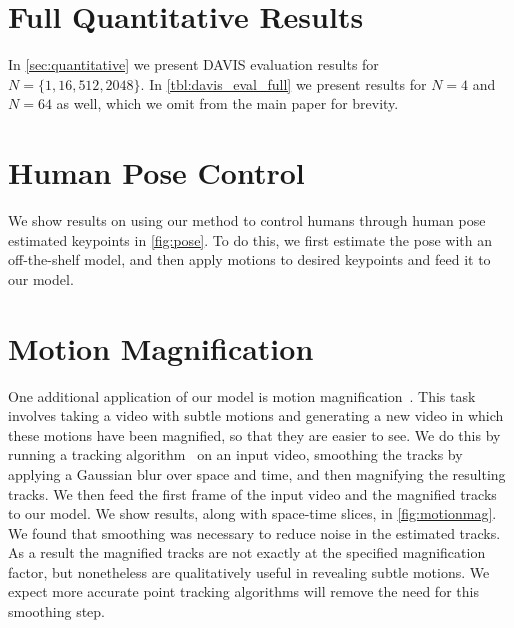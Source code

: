 \section{Full Quantitative Results}
\label{apdx:quantitative}

In \cref{sec:quantitative} we present DAVIS evaluation results for $N = \{1, 16, 512, 2048\}$. In \cref{tbl:davis_eval_full} we present results for $ N = 4 $ and $ N = 64 $ as well, which we omit from the main paper for brevity.



\section{Human Pose Control}
\label{apdx:human_pose}

We show results on using our method to control humans through human pose estimated keypoints in \cref{fig:pose}. To do this, we first estimate the pose with an off-the-shelf model, and then apply motions to desired keypoints and feed it to our model.




\section{Motion Magnification}
\label{apdx:motionmag}

One additional application of our model is motion magnification~\cite{liu2005motion,wu2012eulerian,wadhwa2013phase,oh2018learning,pan2023selfsupervised}. This task involves taking a video with subtle motions and generating a new video in which these motions have been magnified, so that they are easier to see. We do this by running a tracking algorithm~\cite{doersch2023tapir} on an input video, smoothing the tracks by applying a Gaussian blur over space and time, and then magnifying the resulting tracks. We then feed the first frame of the input video and the magnified tracks to our model. We show results, along with space-time slices, in \cref{fig:motionmag}. We found that smoothing was necessary to reduce noise in the estimated tracks. As a result the magnified tracks are not exactly at the specified magnification factor, but nonetheless are qualitatively useful in revealing subtle motions. We expect more accurate point tracking algorithms will remove the need for this smoothing step.


